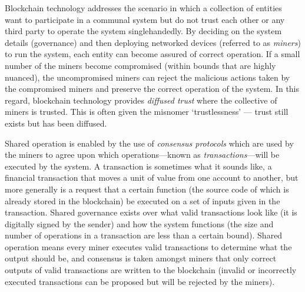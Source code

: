 
Blockchain technology addresses the scenario in which a collection of entities want to participate in a communal system but do not trust each other or any third party to operate the system singlehandedly. By deciding on the system details (governance) and then deploying networked devices (referred to as \emph{miners}) to run the system, each entity can become assured of correct operation. If a small number of the miners become compromised (within bounds that are highly nuanced), the uncompromised miners can reject the malicious actions taken by the compromised miners and preserve the correct operation of the system. In this regard, blockchain technology provides \emph{diffused trust} where the collective of miners is trusted. This is often given the misnomer `trustlessness' --- trust still exists but has been diffused.

Shared operation is enabled by the use of \emph{consensus protocols} which are used by the miners to agree upon which operations---known as \emph{transactions}---will be executed by the system. A transaction is sometimes what it sounds like, a financial transaction that moves a unit of value from one account to another, but more generally is a request that a certain function (the source code of which is already stored in the blockchain) be executed on a set of inputs given in the transaction. Shared governance exists over what valid transactions look like (\eg it is digitally signed by the sender) and how the system functions (\eg the size and number of operations in a transaction are less than a certain bound). Shared operation means every miner executes valid transactions to determine what the output should be, and consensus is taken amongst miners that only correct outputs of valid transactions are written to the blockchain (invalid or incorrectly executed transactions can be proposed but will be rejected by the miners).

